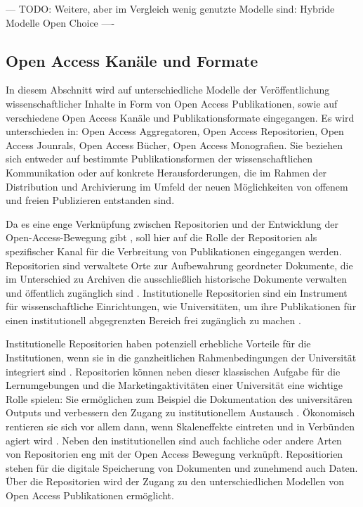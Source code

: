 --- TODO: Weitere, aber im Vergleich wenig genutzte Modelle sind:
Hybride Modelle
Open Choice \cite{Hess_2006} 
----

\subsection{Open Access Kanäle und Formate}
In diesem Abschnitt wird auf unterschiedliche Modelle der Veröffentlichung wissenschaftlicher Inhalte in Form von Open Access Publikationen, sowie auf verschiedene Open Access Kanäle und Publikationsformate eingegangen. Es wird unterschieden in: Open Access Aggregatoren, Open Access Repositorien, Open Access Jounrals, Open Access Bücher, Open Access Monografien. Sie beziehen sich entweder auf bestimmte Publikationsformen der wissenschaftlichen Kommunikation oder auf konkrete Herausforderungen, die im Rahmen der Distribution und Archivierung im Umfeld der neuen Möglichkeiten von offenem und freien Publizieren entstanden sind. 

Da es eine enge Verknüpfung zwischen Repositorien und der Entwicklung der Open-Access-Bewegung gibt \cite{offhaus_2012_institutionelle_repos}, soll hier auf die Rolle der Repositorien als spezifischer Kanal für die Verbreitung von Publikationen eingegangen werden. Repositorien sind verwaltete Orte zur Aufbewahrung geordneter Dokumente, die im Unterschied zu Archiven die ausschließlich historische Dokumente verwalten und öffentlich zugänglich sind \cite{suchen}. Institutionelle Repositorien sind ein Instrument für wissenschaftliche Einrichtungen, wie Universitäten, um ihre Publikationen für einen institutionell abgegrenzten Bereich frei zugänglich zu machen \cite{dobratz_2007_open}.

Institutionelle Repositorien haben potenziell erhebliche Vorteile für die Institutionen, wenn sie in die ganzheitlichen Rahmenbedingungen der Universität integriert sind \cite{steele_2006}. Repositorien können neben dieser klassischen Aufgabe für die Lernumgebungen und die Marketingaktivitäten einer Universität eine wichtige Rolle spielen: Sie ermöglichen zum Beispiel die Dokumentation des universitären Outputs und verbessern den Zugang zu institutionellem Austausch \cite{steele_2006}. Ökonomisch rentieren sie sich vor allem dann, wenn Skaleneffekte eintreten und in Verbünden agiert wird \cite{blythe_2005value}. Neben den institutionellen sind auch fachliche oder andere Arten von Repositorien eng mit der Open Access Bewegung verknüpft. Repositiorien stehen  für die digitale Speicherung von Dokumenten und zunehmend auch Daten. Über die Repositorien wird der Zugang zu den unterschiedlichen Modellen von Open Access Publikationen ermöglicht.

